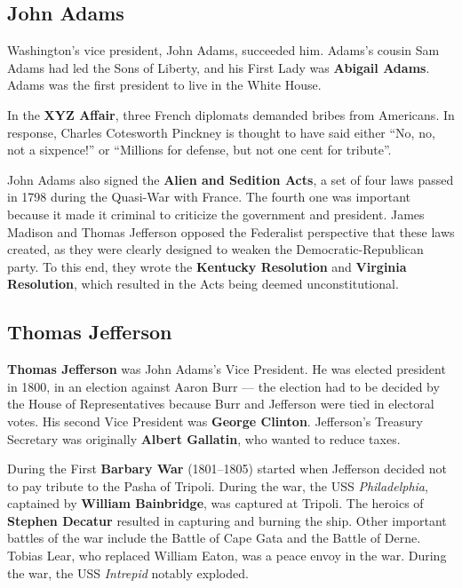 \subsection*{John Adams}

Washington's vice president, John Adams, succeeded him.
Adams's cousin Sam Adams had led the Sons of Liberty,
and his First Lady was \textbf{Abigail Adams}.
Adams was the first president to live in the White House.

In the \textbf{XYZ Affair}, three French diplomats demanded bribes from Americans.
In response, Charles Cotesworth Pinckney is thought to have said either
``No, no, not a sixpence!'' or ``Millions for defense, but not one cent for tribute''.

John Adams also signed the \textbf{Alien and Sedition Acts},
a set of four laws passed in 1798 during the Quasi-War with France.
The fourth one was important because it made it criminal to criticize the government and president.
James Madison and Thomas Jefferson opposed the Federalist perspective that these laws created,
as they were clearly designed to weaken the Democratic-Republican party.
To this end, they wrote the \textbf{Kentucky Resolution} and \textbf{Virginia Resolution},
which resulted in the Acts being deemed unconstitutional.

\subsection*{Thomas Jefferson}

\textbf{Thomas Jefferson} was John Adams's Vice President.
He was elected president in 1800, in an election against Aaron Burr ---
the election had to be decided by the House of Representatives
because Burr and Jefferson were tied in electoral votes.
His second Vice President was \textbf{George Clinton}.
Jefferson's Treasury Secretary was originally \textbf{Albert Gallatin}, who wanted to reduce taxes.

During the First \textbf{Barbary War} (1801--1805)
started when Jefferson decided not to pay tribute to the Pasha of Tripoli.
During the war, the USS \textit{Philadelphia}, captained by \textbf{William Bainbridge}, was captured at Tripoli.
The heroics of \textbf{Stephen Decatur} resulted in capturing and burning the ship.
Other important battles of the war include the Battle of Cape Gata and the Battle of Derne.
Tobias Lear, who replaced William Eaton, was a peace envoy in the war.
During the war, the USS \textit{Intrepid} notably exploded.

